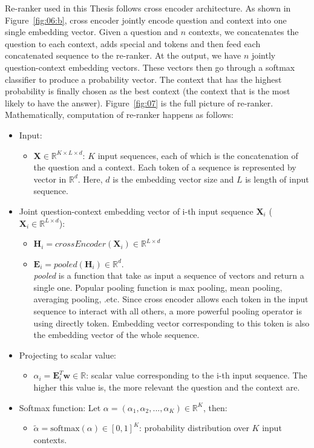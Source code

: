 \documentclass[3p, sort&compress, 12pt]{elsarticle}
\begin{document}
\par Re-ranker used in this Thesis follows cross encoder architecture. As shown in Figure~\ref{fig:06:b}, cross encoder jointly encode question and context into one single embedding vector. Given a question and $n$ contexts, we concatenates the question to each context, adds special {\sffamily [CLS]} and {\sffamily [SEP]} tokens and then feed each concatenated sequence to the re-ranker. At the output, we have $n$ jointly question-context embedding vectors. These vectors then go through a softmax classifier to produce a probability vector. The context that has the highest probability is finally chosen as the best context (the context that is the most likely to have the answer). Figure~\ref{fig:07} is the full picture of re-ranker. Mathematically, computation of re-ranker happens as follows:
\begin{itemize}
	\item Input:
	\begin{itemize}
		\item $\mathbf{X} \in \mathbb{R}^{K \times L \times d}$: $K$ input sequences, each of which is the concatenation of the question and a context. Each token of a sequence is represented by vector in $\mathbb{R}^d$. Here, $d$ is the embedding vector size and $L$ is length of input sequence.
	\end{itemize}
	\item Joint question-context embedding vector of i-th input sequence $\mathbf{X}_i$ ($\mathbf{X}_i \in \mathbb{R}^{L \times d}$):
	\begin{itemize}
		\item $\mathbf{H}_i = crossEncoder\left(\mathbf{X}_i\right) \in \mathbb{R}^{L \times d}$
		\item $\mathbf{E}_i = pooled\left(\mathbf{H}_i\right) \in \mathbb{R}^d$. \\\textit{pooled} is a function that take as input a sequence of vectors and return a single one. Popular pooling function is max pooling, mean pooling, averaging pooling, .etc. Since cross encoder allows each token in the input sequence to interact with all others, a more powerful pooling operator is using directly {\sf [CLS]} token. Embedding vector corresponding to this token is also the embedding vector of the whole sequence.
	\end{itemize}
	\item Projecting to scalar value:
	\begin{itemize}
		\item $\alpha_i = \mathbf{E}_i^T\mathbf{w} \in \mathbb{R}$: scalar value corresponding to the i-th input sequence. The higher this value is, the more relevant the question and the context are.
	\end{itemize}
	\item Softmax function: Let $\alpha = \left(\alpha_1, \alpha_2, ..., \alpha_K\right) \in \mathbb{R}^K$, then:
	\begin{itemize}
		\item $\tilde{\alpha} = \text{softmax}\left(\alpha\right) \in [0, 1]^K$: probability distribution over $K$ input contexts.
	\end{itemize}
\end{itemize}
\end{document}
